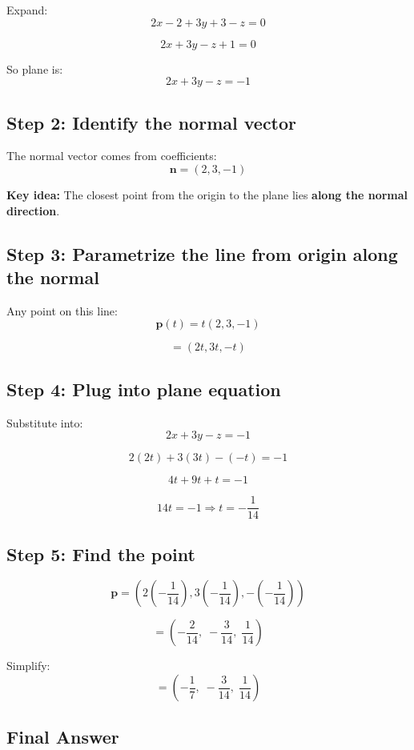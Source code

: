 \documentclass[11pt]{article}
\begin{document}
Expand:
\[
2x - 2 + 3y + 3 - z = 0
\]

\[
2x + 3y - z + 1 = 0
\]

So plane is:
\[
2x + 3y - z = -1
\]

\hrulefill

\subsection*{Step 2: Identify the normal vector}

The normal vector comes from coefficients:
\[
\mathbf{n} = (2,3,-1)
\]

\textbf{Key idea:}
The closest point from the origin to the plane lies \textbf{along the normal direction}.

\hrulefill

\subsection*{Step 3: Parametrize the line from origin along the normal}

Any point on this line:
\[
\mathbf{p}(t) = t(2,3,-1)
\]

\[
= (2t, 3t, -t)
\]

\hrulefill

\subsection*{Step 4: Plug into plane equation}

Substitute into:
\[
2x + 3y - z = -1
\]

\[
2(2t) + 3(3t) - (-t) = -1
\]

\[
4t + 9t + t = -1
\]

\[
14t = -1
\Rightarrow t = -\frac{1}{14}
\]

\hrulefill

\subsection*{Step 5: Find the point}

\[
\mathbf{p} =
\left(
2\left(-\frac{1}{14}\right),
3\left(-\frac{1}{14}\right),
-\left(-\frac{1}{14}\right)
\right)
\]

\[
=
\left(
-\frac{2}{14},\;
-\frac{3}{14},\;
\frac{1}{14}
\right)
\]

Simplify:
\[
=
\left(
-\frac{1}{7},\;
-\frac{3}{14},\;
\frac{1}{14}
\right)
\]

\subsection*{Final Answer}
\end{document}
